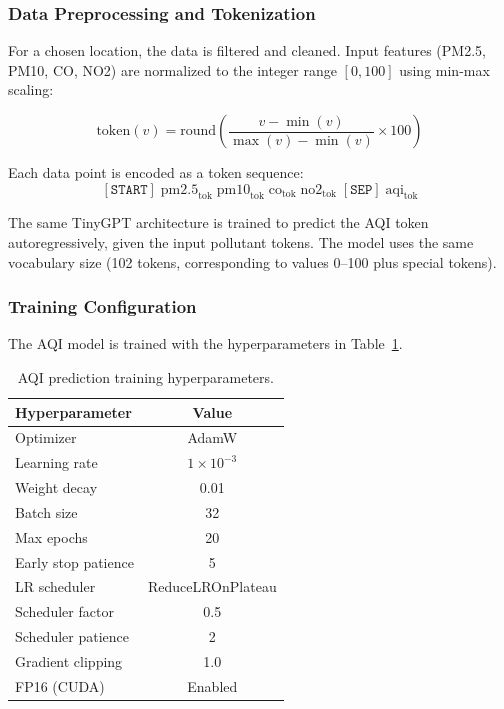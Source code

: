 \documentclass[conference]{IEEEtran}
\begin{document}
\subsubsection{Data Preprocessing and Tokenization}

For a chosen location, the data is filtered and cleaned. Input features (PM2.5, PM10, CO, NO2) are normalized to the integer range $[0, 100]$ using min-max scaling:

\begin{equation}
\text{token}(v) = \text{round}\left(\frac{v - \min(v)}{\max(v) - \min(v)} \times 100\right)
\end{equation}

Each data point is encoded as a token sequence:
\[
[\texttt{START}]\; \text{pm2.5}_{\text{tok}}\; \text{pm10}_{\text{tok}}\; \text{co}_{\text{tok}}\; \text{no2}_{\text{tok}}\; [\texttt{SEP}]\; \text{aqi}_{\text{tok}}
\]

The same TinyGPT architecture is trained to predict the AQI token autoregressively, given the input pollutant tokens. The model uses the same vocabulary size (102 tokens, corresponding to values 0--100 plus special tokens).

\subsubsection{Training Configuration}

The AQI model is trained with the hyperparameters in Table~\ref{tab:aqi_hp}.

\begin{table}[t]
\centering
\caption{AQI prediction training hyperparameters.}
\label{tab:aqi_hp}
\begin{tabular}{lc}
\toprule
\textbf{Hyperparameter} & \textbf{Value} \\
\midrule
Optimizer & AdamW \\
Learning rate & $1 \times 10^{-3}$ \\
Weight decay & 0.01 \\
Batch size & 32 \\
Max epochs & 20 \\
Early stop patience & 5 \\
LR scheduler & ReduceLROnPlateau \\
Scheduler factor & 0.5 \\
Scheduler patience & 2 \\
Gradient clipping & 1.0 \\
FP16 (CUDA) & Enabled \\
\bottomrule
\end{tabular}
\end{table}
\end{document}
